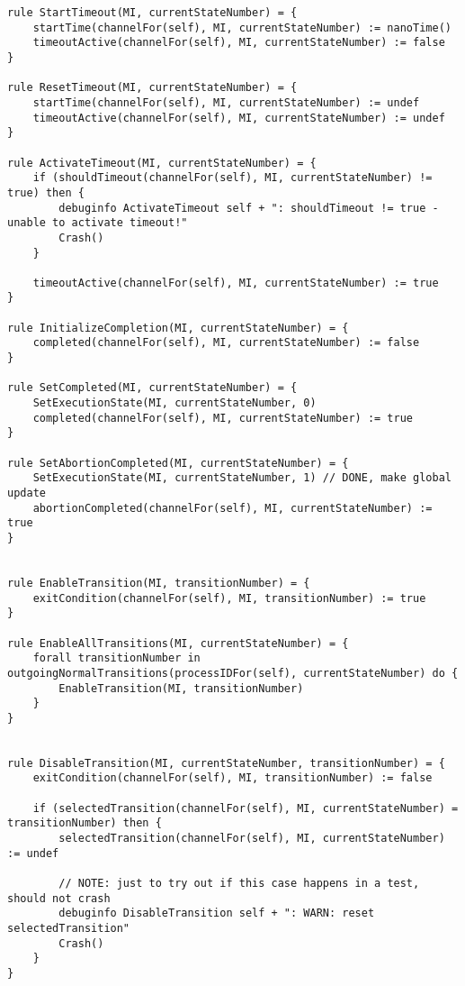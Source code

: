 \begin{listing}[H]
\begin{verbatim}
rule StartTimeout(MI, currentStateNumber) = {
    startTime(channelFor(self), MI, currentStateNumber) := nanoTime()
    timeoutActive(channelFor(self), MI, currentStateNumber) := false
}

rule ResetTimeout(MI, currentStateNumber) = {
    startTime(channelFor(self), MI, currentStateNumber) := undef
    timeoutActive(channelFor(self), MI, currentStateNumber) := undef
}

rule ActivateTimeout(MI, currentStateNumber) = {
    if (shouldTimeout(channelFor(self), MI, currentStateNumber) != true) then {
        debuginfo ActivateTimeout self + ": shouldTimeout != true - unable to activate timeout!"
        Crash()
    }

    timeoutActive(channelFor(self), MI, currentStateNumber) := true
}

rule InitializeCompletion(MI, currentStateNumber) = {
    completed(channelFor(self), MI, currentStateNumber) := false
}

rule SetCompleted(MI, currentStateNumber) = {
    SetExecutionState(MI, currentStateNumber, 0)
    completed(channelFor(self), MI, currentStateNumber) := true
}

rule SetAbortionCompleted(MI, currentStateNumber) = {
    SetExecutionState(MI, currentStateNumber, 1) // DONE, make global update
    abortionCompleted(channelFor(self), MI, currentStateNumber) := true
}


rule EnableTransition(MI, transitionNumber) = {
    exitCondition(channelFor(self), MI, transitionNumber) := true
}

rule EnableAllTransitions(MI, currentStateNumber) = {
    forall transitionNumber in outgoingNormalTransitions(processIDFor(self), currentStateNumber) do {
        EnableTransition(MI, transitionNumber)
    }
}


rule DisableTransition(MI, currentStateNumber, transitionNumber) = {
    exitCondition(channelFor(self), MI, transitionNumber) := false

    if (selectedTransition(channelFor(self), MI, currentStateNumber) = transitionNumber) then {
        selectedTransition(channelFor(self), MI, currentStateNumber) := undef

        // NOTE: just to try out if this case happens in a test, should not crash
        debuginfo DisableTransition self + ": WARN: reset selectedTransition"
        Crash()
    }
}


\end{verbatim}
\end{listing}
